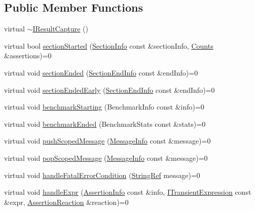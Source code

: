 \subsection*{Public Member Functions}
\begin{DoxyCompactItemize}
\item 
virtual \hyperlink{struct_catch_1_1_i_result_capture_a3bd16719d6772b7470887fc36c6d0808}{$\sim$\-I\-Result\-Capture} ()
\item 
virtual bool \hyperlink{struct_catch_1_1_i_result_capture_a5b76ed52badcb64cf374202e12b81a03}{section\-Started} (\hyperlink{struct_catch_1_1_section_info}{Section\-Info} const \&section\-Info, \hyperlink{struct_catch_1_1_counts}{Counts} \&assertions)=0
\item 
virtual void \hyperlink{struct_catch_1_1_i_result_capture_a4e152bc43dc0933684e31fa67a58195d}{section\-Ended} (\hyperlink{struct_catch_1_1_section_end_info}{Section\-End\-Info} const \&end\-Info)=0
\item 
virtual void \hyperlink{struct_catch_1_1_i_result_capture_afcc71eef8ca821ae132cced4a2be6988}{section\-Ended\-Early} (\hyperlink{struct_catch_1_1_section_end_info}{Section\-End\-Info} const \&end\-Info)=0
\item 
virtual void \hyperlink{struct_catch_1_1_i_result_capture_a264ae12330c74b2daae41715a30d51bf}{benchmark\-Starting} (Benchmark\-Info const \&info)=0
\item 
virtual void \hyperlink{struct_catch_1_1_i_result_capture_a6e5e64f9d94211a888249012ab6cc7fb}{benchmark\-Ended} (Benchmark\-Stats const \&stats)=0
\item 
virtual void \hyperlink{struct_catch_1_1_i_result_capture_a91d154c1e087e383dcde5aad95cb6a05}{push\-Scoped\-Message} (\hyperlink{struct_catch_1_1_message_info}{Message\-Info} const \&message)=0
\item 
virtual void \hyperlink{struct_catch_1_1_i_result_capture_a42bcb13276706bf8c3ce081ce16d37fd}{pop\-Scoped\-Message} (\hyperlink{struct_catch_1_1_message_info}{Message\-Info} const \&message)=0
\item 
virtual void \hyperlink{struct_catch_1_1_i_result_capture_a48559e6598ba9474b903697b69c769b2}{handle\-Fatal\-Error\-Condition} (\hyperlink{class_catch_1_1_string_ref}{String\-Ref} message)=0
\item 
virtual void \hyperlink{struct_catch_1_1_i_result_capture_a59a2b05391e464954575d2afb6d5d607}{handle\-Expr} (\hyperlink{struct_catch_1_1_assertion_info}{Assertion\-Info} const \&info, \hyperlink{struct_catch_1_1_i_transient_expression}{I\-Transient\-Expression} const \&expr, \hyperlink{struct_catch_1_1_assertion_reaction}{Assertion\-Reaction} \&reaction)=0

\end{DoxyCompactItemize}
